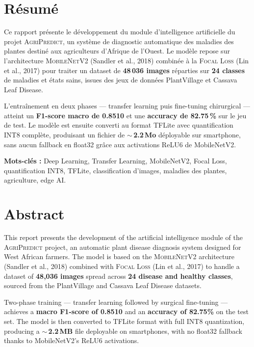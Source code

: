 \documentclass[12pt, a4paper, twoside]{report}
\newcommand{\focal}{\textsc{Focal Loss}}
\newcommand{\mobilenet}{\textsc{MobileNetV2}}
\newcommand{\agri}{\textsc{AgriPredict}}
\begin{document}
\chapter*{Résumé}

Ce rapport présente le développement du module d'intelligence artificielle du projet \agri{}, un système de diagnostic automatique des maladies des plantes destiné aux agriculteurs d'Afrique de l'Ouest. Le modèle repose sur l'architecture \mobilenet{} (Sandler et al., 2018) combinée à la \focal{} (Lin et al., 2017) pour traiter un dataset de \textbf{48\,036 images} réparties sur \textbf{24 classes} de maladies et états sains, issues des jeux de données PlantVillage et Cassava Leaf Disease.

L'entraînement en deux phases --- transfer learning puis fine-tuning chirurgical --- atteint un \textbf{F1-score macro de 0.8510} et une \textbf{accuracy de 82.75\,\%} sur le jeu de test. Le modèle est ensuite converti au format TFLite avec quantification INT8 complète, produisant un fichier de \textbf{$\sim$\,2.2\,Mo} déployable sur smartphone, sans aucun fallback en float32 grâce aux activations ReLU6 de MobileNetV2.

\textbf{Mots-clés :} Deep Learning, Transfer Learning, MobileNetV2, Focal Loss, quantification INT8, TFLite, classification d'images, maladies des plantes, agriculture, edge AI.

\vspace{1cm}

\chapter*{Abstract}

This report presents the development of the artificial intelligence module of the \agri{} project, an automatic plant disease diagnosis system designed for West African farmers. The model is based on the \mobilenet{} architecture (Sandler et al., 2018) combined with \focal{} (Lin et al., 2017) to handle a dataset of \textbf{48,036 images} spread across \textbf{24 disease and healthy classes}, sourced from the PlantVillage and Cassava Leaf Disease datasets.

Two-phase training --- transfer learning followed by surgical fine-tuning --- achieves a \textbf{macro F1-score of 0.8510} and an \textbf{accuracy of 82.75\%} on the test set. The model is then converted to TFLite format with full INT8 quantization, producing a \textbf{$\sim$\,2.2\,MB} file deployable on smartphones, with no float32 fallback thanks to MobileNetV2's ReLU6 activations.
\end{document}
